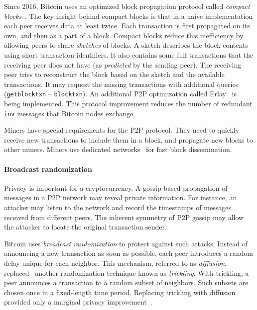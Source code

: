 Since 2016, Bitcoin uses an optimized block propagation protocol called \textit{compact blocks}~\cite{Core2016}.
The key insight behind compact blocks is that in a naive implementation each peer receives data at least twice.
Each transaction is first propagated on its own, and then as a part of a block.
Compact blocks reduce this inefficiency by allowing peers to share \textit{sketches} of blocks.
A sketch describes the block contents using short transaction identifiers.
It also contains some full transactions that the receiving peer does not have (as \textit{predicted} by the sending peer).
The receiving peer tries to reconstruct the block based on the sketch and the available transactions.
It may request the missing transactions with additional queries (\texttt{getblocktxn} -- \texttt{blocktxn}).
An additional P2P optimization called Erlay~\cite{Naumenko2019} is being implemented.
This protocol improvement reduces the number of redundant \texttt{inv} messages that Bitcoin nodes exchange.

Miners have special requirements for the P2P protocol.
They need to quickly receive new transactions to include them in a block, and propagate new blocks to other miners.
Miners use dedicated networks~\cite{FALCON, FIBRE} for fast block dissemination.


\paragraph{Broadcast randomization}

Privacy is important for a cryptocurrency.
A gossip-based propagation of messages in a P2P network may reveal private information.
For instance, an attacker may listen to the network and record the timestamps of messages received from different peers.
The inherent symmetry of P2P gossip may allow the attacker to locate the original transaction sender.

Bitcoin uses \textit{broadcast randomization} to protect against such attacks.
Instead of announcing a new transaction as soon as possible, each peer introduces a random delay unique for each neighbor.
This mechanism, referred to as \textit{diffusion}, replaced~\cite{Wuille} another randomization technique known as \textit{trickling}.
With trickling, a peer announces a transaction to a random subset of neighbors.
Such subsets are chosen once in a fixed-length time period.
Replacing trickling with diffusion provided only a marginal privacy improvement~\cite{Fanti2017}.



